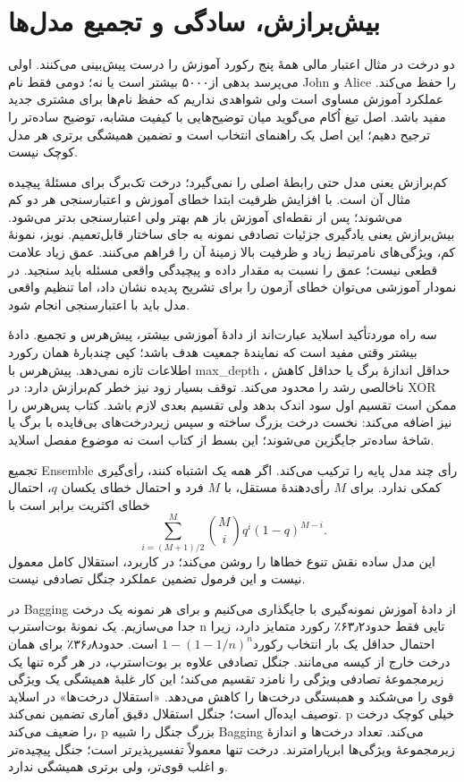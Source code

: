 \section{بیش‌برازش، سادگی و تجمیع مدل‌ها}

دو درخت در مثال اعتبار مالی همهٔ پنج رکورد آموزش را درست پیش‌بینی می‌کنند. اولی می‌پرسد بدهی از۵۰۰۰ بیشتر است یا نه؛ دومی فقط نام John و Alice را حفظ می‌کند. عملکرد آموزش مساوی است ولی شواهدی نداریم که حفظ نام‌ها برای مشتری جدید مفید باشد. اصل تیغ اُکام می‌گوید میان توضیح‌هایی با کیفیت مشابه، توضیح ساده‌تر را ترجیح دهیم؛ این اصل یک راهنمای انتخاب است و تضمین همیشگی برتری هر مدل کوچک نیست.

کم‌برازش یعنی مدل حتی رابطهٔ اصلی را نمی‌گیرد؛ درخت تک‌برگ برای مسئلهٔ پیچیده مثال آن است. با افزایش ظرفیت ابتدا خطای آموزش و اعتبارسنجی هر دو کم می‌شوند؛ پس از نقطه‌ای آموزش باز هم بهتر ولی اعتبارسنجی بدتر می‌شود. بیش‌برازش یعنی یادگیری جزئیات تصادفی نمونه به جای ساختار قابل‌تعمیم. نویز، نمونهٔ کم، ویژگی‌های نامرتبط زیاد و ظرفیت بالا زمینهٔ آن را فراهم می‌کنند. عمق زیاد علامت قطعی نیست؛ عمق را نسبت به مقدار داده و پیچیدگی واقعی مسئله باید سنجید. در نمودار آموزشی می‌توان خطای آزمون را برای تشریح پدیده نشان داد، اما تنظیم واقعی مدل باید با اعتبارسنجی انجام شود.

سه راه موردتأکید اسلاید عبارت‌اند از دادهٔ آموزشی بیشتر، پیش‌هرس و تجمیع. دادهٔ بیشتر وقتی مفید است که نمایندهٔ جمعیت هدف باشد؛ کپی چندبارهٔ همان رکورد اطلاعات تازه نمی‌دهد. پیش‌هرس با max\_depth ، حداقل اندازهٔ برگ یا حداقل کاهش ناخالصی رشد را محدود می‌کند. توقف بسیار زود نیز خطر کم‌برازش دارد: در XOR ممکن است تقسیم اول سود اندک بدهد ولی تقسیم بعدی لازم باشد. کتاب پس‌هرس را نیز اضافه می‌کند: نخست درخت بزرگ ساخته و سپس زیر‌درخت‌های بی‌فایده با برگ یا شاخهٔ ساده‌تر جایگزین می‌شوند؛ این بسط از کتاب است نه موضوع مفصل اسلاید.

تجمیع Ensemble رأی چند مدل پایه را ترکیب می‌کند. اگر همه یک اشتباه کنند، رأی‌گیری کمکی ندارد. برای $M$ رأی‌دهندهٔ مستقل، با $M$ فرد و احتمال خطای یکسان $q$، احتمال خطای اکثریت برابر است با
\[\sum_{i=(M+1)/2}^{M}\binom Mi q^i(1-q)^{M-i}.\]
این مدل ساده نقش تنوع خطاها را روشن می‌کند؛ در کاربرد، استقلال کامل معمول نیست و این فرمول تضمین عملکرد جنگل تصادفی نیست.

در Bagging از دادهٔ آموزش نمونه‌گیری با جایگذاری می‌کنیم و برای هر نمونه یک درخت جدا می‌سازیم. یک نمونهٔ بوت‌استرپ n تایی فقط حدود۶۳٫۲٪ رکورد متمایز دارد، زیرا احتمال حداقل یک بار انتخاب رکورد$1-(1-1/n)^n$ است. حدود۳۶٫۸٪ برای همان درخت خارج از کیسه می‌مانند. جنگل تصادفی علاوه بر بوت‌استرپ، در هر گره تنها یک زیرمجموعهٔ تصادفی ویژگی را نامزد تقسیم می‌کند؛ این کار غلبهٔ همیشگی یک ویژگی قوی را می‌شکند و همبستگی درخت‌ها را کاهش می‌دهد. «استقلال درخت‌ها» در اسلاید توصیف ایده‌آل است؛ جنگل استقلال دقیق آماری تضمین نمی‌کند. p خیلی کوچک درخت را ضعیف می‌کند، p بزرگ جنگل را شبیه Bagging می‌کند. تعداد درخت‌ها و اندازهٔ زیرمجموعهٔ ویژگی‌ها ابرپارامترند. درخت تنها معمولاً تفسیرپذیرتر است؛ جنگل پیچیده‌تر و اغلب قوی‌تر، ولی برتری همیشگی ندارد.

